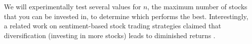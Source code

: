 We will experimentally test several values for $n$, the maximum number of stocks that you can be invested in, to determine which performs the best.
Interestingly, a related work on sentiment-based stock trading strategies claimed that diversification (investing in more stocks) leads to diminished returns \cite{tradingSentimentPaper}.

